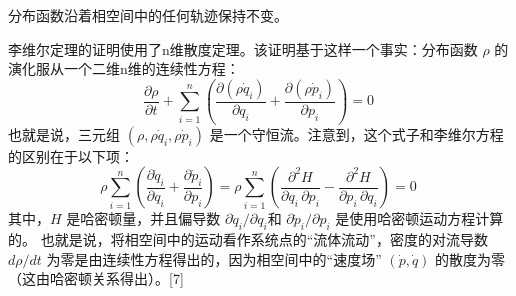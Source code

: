 分布函数沿着相空间中的任何轨迹保持不变。  

李维尔定理的证明使用了n维散度定理。该证明基于这样一个事实：分布函数 \(\rho\) 的演化服从一个二维n维的连续性方程：
\[
\frac{\partial \rho}{\partial t} + \sum_{i=1}^{n} \left( \frac{\partial (\rho \dot{q}_i)}{\partial q_i} + \frac{\partial (\rho \dot{p}_i)}{\partial p_i} \right) = 0~
\]
也就是说，三元组 \((\rho, \rho \dot{q}_i, \rho \dot{p}_i)\) 是一个守恒流。注意到，这个式子和李维尔方程的区别在于以下项：
\[
\rho \sum_{i=1}^{n} \left( \frac{\partial \dot{q}_i}{\partial q_i} + \frac{\partial \dot{p}_i}{\partial p_i} \right) = \rho \sum_{i=1}^{n} \left( \frac{\partial^2 H}{\partial q_i \, \partial p_i} - \frac{\partial^2 H}{\partial p_i \, \partial q_i} \right) = 0~
\]
其中，\( H \) 是哈密顿量，并且偏导数 \(\partial \dot{q}_i/\partial q_i\)和 \(\partial \dot{p}_i/\partial p_i\) 是使用哈密顿运动方程计算的。  
也就是说，将相空间中的运动看作系统点的“流体流动”，密度的对流导数 \(d\rho/dt\) 为零是由连续性方程得出的，因为相空间中的“速度场” \((\dot{p}, \dot{q})\) 的散度为零（这由哈密顿关系得出）。[7]